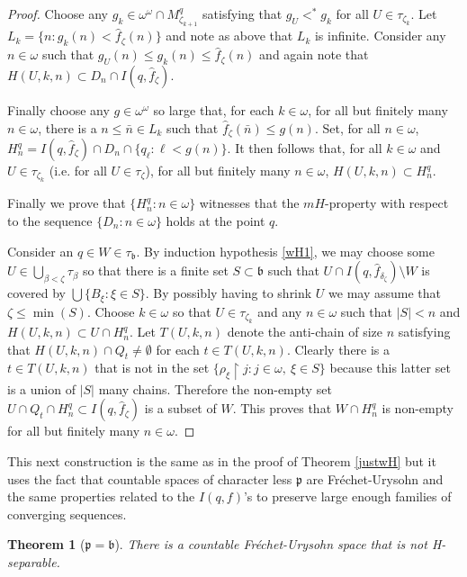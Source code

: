 \documentclass{amsart}
\newtheorem{theorem}[thm]{Theorem}
\theoremstyle{definition}
\theoremstyle{remark}
\begin{document}
\begin{proof}
Choose any $g_k\in \omega^\omega\cap M^q_{\zeta_{k+1}}$ satisfying
that $g_U <^* g_k $ for all $U\in \tau_{\zeta_k}$. Let $L_k  =\{n: 
  g_k(n) < \hat f_{\zeta}(n)\}$ and note as above that $L_k$ is infinite. 
  Consider any $n\in\omega$ such that $g_U(n) \leq g_k(n) \leq \hat f_{\zeta}(n)$
  and again note that $H(U,k,n)\subset D_n\cap I(q,\hat f_\zeta)$.   
  
  Finally choose any $g\in \omega^\omega$ so large that, for each $k\in\omega$,
  for all but finitely many $n\in\omega$, there is a $n\leq \bar n \in L_k$
  such that $\hat f_\zeta (\bar n) \leq g(n)$. 
  Set, for all $n\in\omega$,  $H^q_n = I(q, \hat f_\zeta)\cap D_n \cap \{q_\ell : \ell < g(n)\}$.
  It then follows that, 
  for all $k\in\omega$ and $U\in \tau_{\zeta_k}$ (i.e. for all $U\in \tau_{\zeta}$),
  for all but finitely many $n\in\omega$,  $H(U,k,n)\subset H^q_n$.

  Finally we prove that $\{ H^q_n : n\in\omega\}$ witnesses that the $mH$-property
  with respect to the sequence $\{D_n : n\in\omega\}$ holds at the point $q$.

  Consider an $q\in W\in\tau_{\mathfrak b}$.
By induction hypothesis \ref{wH1},
 we may choose some $U \in \bigcup_{\beta<\zeta}\tau_\beta$
 so that there is a
 finite set $ S\subset  \mathfrak b $ 
 such that $U  \cap I(q,\hat f_{\delta_\zeta})\setminus W$
 is covered by $\bigcup\{ B_\xi : \xi \in S\}$.
 By possibly having to shrink $U$ we may assume that
  $\zeta \leq \min(S)$. 
  Choose $k\in\omega$ so that $U\in \tau_{\zeta_k}$ 
  and   any $n\in\omega$ such that $|S|< n$
  and $H(U,k,n)\subset U\cap  H^q_n$. Let $T(U,k,n)$ denote
  the anti-chain of size $n$ satisfying that
     $H(U,k,n)\cap Q_t\neq\emptyset$ for each $t\in T(U,k,n)$. 
 Clearly there is a $t\in T(U,k,n)$ that is not in
 the set $\{ \rho_\xi\restriction j : j\in \omega,\ \xi\in S\}$
 because this latter set is a union of $|S|$ many chains. 
 Therefore the non-empty set $U\cap Q_t\cap H^q_n\subset I(q,\hat f_{\zeta})$
 is a subset
 of $W$. This proves that $W\cap H^q_n$ is non-empty for all but
 finitely many $n\in\omega$.
 \end{proof}


This next construction  is   the same as  in 
the proof of Theorem \ref{justwH} but it uses
the fact that countable spaces of character
less $\mathfrak p$ are Fr\'echet-Urysohn and
the same properties related to the $I(q,f)$'s to
preserve large enough families of converging sequences. 

\begin{theorem}[$\mathfrak p = \mathfrak b$]
There is a countable Fr\'echet-Urysohn space that is
 not H-separable.
\end{theorem}
\end{document}
